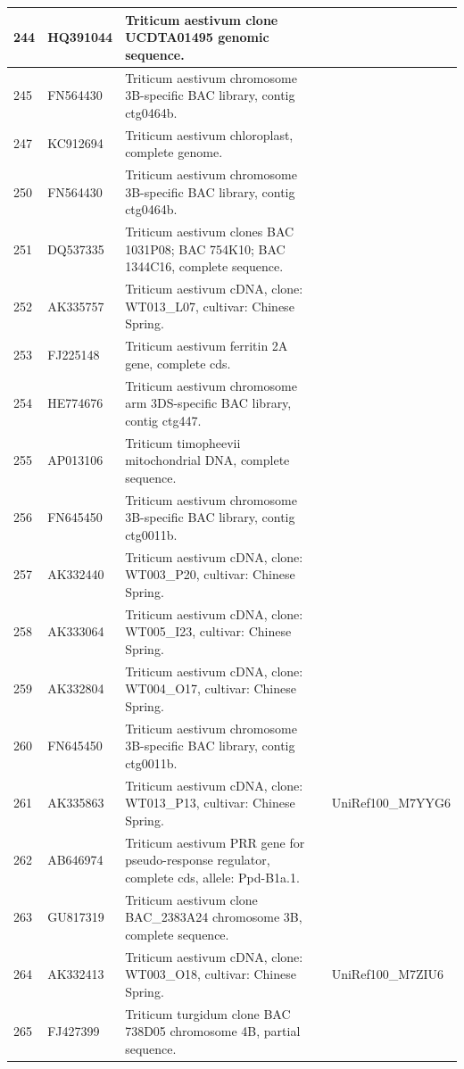\documentclass[10.9pt]{article} %
\begin{document}
{\begin{longtable}{|p{1.5cm}|p{2cm}|p{9cm}|p{3cm}|}
\hline
244 & HQ391044 & Triticum aestivum clone UCDTA01495 genomic sequence. & \\
\hline
245 & FN564430 & Triticum aestivum chromosome 3B-specific BAC library, contig ctg0464b. & \\
\hline
247 & KC912694 & Triticum aestivum chloroplast, complete genome. & \\
\hline
250 & FN564430 & Triticum aestivum chromosome 3B-specific BAC library, contig ctg0464b. & \\
\hline
251 & DQ537335 & Triticum aestivum clones BAC 1031P08; BAC 754K10; BAC 1344C16, complete sequence. & \\
\hline
252 & AK335757 & Triticum aestivum cDNA, clone: WT013\_L07, cultivar: Chinese Spring. & \\
\hline
253 & FJ225148 & Triticum aestivum ferritin 2A gene, complete cds. & \\
\hline
254 & HE774676 & Triticum aestivum chromosome arm 3DS-specific BAC library, contig ctg447. & \\
\hline
255 & AP013106 & Triticum timopheevii mitochondrial DNA, complete sequence. & \\
\hline
256 & FN645450 & Triticum aestivum chromosome 3B-specific BAC library, contig ctg0011b. & \\
\hline
257 & AK332440 & Triticum aestivum cDNA, clone: WT003\_P20, cultivar: Chinese Spring. & \\
\hline
258 & AK333064 & Triticum aestivum cDNA, clone: WT005\_I23, cultivar: Chinese Spring. & \\
\hline
259 & AK332804 & Triticum aestivum cDNA, clone: WT004\_O17, cultivar: Chinese Spring. & \\
\hline
260 & FN645450 & Triticum aestivum chromosome 3B-specific BAC library, contig ctg0011b. & \\
\hline
261 & AK335863 & Triticum aestivum cDNA, clone: WT013\_P13, cultivar: Chinese Spring. & UniRef100\_M7YYG6\\
\hline
262 & AB646974 & Triticum aestivum PRR gene for pseudo-response regulator, complete cds, allele: Ppd-B1a.1. & \\
\hline
263 & GU817319 & Triticum aestivum clone BAC\_2383A24 chromosome 3B, complete sequence. & \\
\hline
264 & AK332413 & Triticum aestivum cDNA, clone: WT003\_O18, cultivar: Chinese Spring. & UniRef100\_M7ZIU6\\
\hline
265 & FJ427399 & Triticum turgidum clone BAC 738D05 chromosome 4B, partial sequence. & \\

\end{longtable}}
\end{document}
